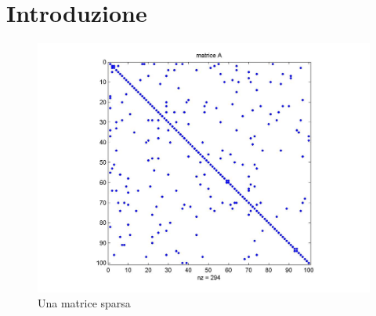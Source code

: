 \documentclass[a4paper]{extreport}
\begin{document}
\chapter{Introduzione}
\begin{figure}
    \includegraphics[width=\textwidth]{immagini/sparse.png}
    \caption{Una matrice sparsa}
\end{figure}
\end{document}
